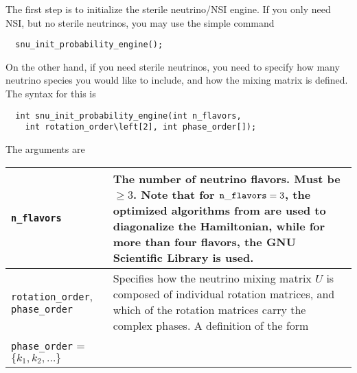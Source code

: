 \documentclass{article}
\begin{document}
The first step is to initialize the sterile neutrino/NSI engine. If you only
need NSI, but no sterile neutrinos, you may use the simple command
\begin{verbatim}
  snu_init_probability_engine();
\end{verbatim}
On the other hand, if you need sterile neutrinos, you need to specify how
many neutrino species you would like to include, and how the mixing matrix
is defined. The syntax for this is
\begin{verbatim}
  int snu_init_probability_engine(int n_flavors,
    int rotation_order\left[2], int phase_order[]);
\end{verbatim}
\noindent The arguments are
\begin{longtable}{p{2.5cm}p{8.5cm}}
  \toprule
  {\tt n\_flavors}      & The number of neutrino flavors. Must be $\geq 3$.
                          Note that for ${\tt n\_flavors} = 3$, the optimized
                          algorithms from \cite{Kopp:2006wp} are used to
                          diagonalize the Hamiltonian, while for more than four
                          flavors, the GNU Scientific Library is used. \\\midrule
  {\tt rotation\_order}, {\tt phase\_order} &
    Specifies how the neutrino mixing matrix $U$ is composed of individual rotation
    matrices, and which of the rotation matrices carry the complex phases. A
    definition of the form
    \begin{flushleft}
      {\tt rotation\_order} = \{\{$i_1$, $j_1$\}, \{$i_2$, $j_2$\}, \dots \} \\
      {\tt phase\_order} = $\{k_1, k_2, \dots\}$
    \end{flushleft}
    means $U = R(\theta_{i_1 j_1},
    \delta_{k_1}) R(\theta_{i_2 j_2}, \delta_{k_2}) \cdots$, where
    \begin{displaymath}
      R(\theta_{ij},\delta_k) =
        \begin{pmatrix}
          0      & \cdots &   0             & \cdots &   0                    & \cdots & 0 \\
          \vdots &        & \vdots          &        & \vdots                 &        & \vdots \\
          0      & \cdots & \cos\theta_{ij} & \cdots & e^{i\delta_k} \sin\theta_{ij} & \cdots & 0 \\
          \vdots &        & \vdots          &        & \vdots                 &        & \vdots \\
          0      & \cdots & -e^{-i\delta_k} \sin\theta_{ij} & \cdots & \cos\theta_{ij} & \cdots & 0 \\

\end{pmatrix}
\end{displaymath}
\end{longtable}
\end{document}
